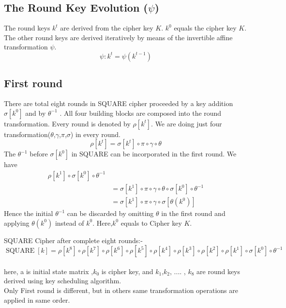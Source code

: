 \documentclass[preprint]{transcrypto}
\begin{document}
\subsection{The Round Key Evolution ($\psi$)}
The round keys $k^{t}$ are derived from the cipher key $K$. $k^{0}$ equals the cipher key $K$. The other round keys are derived iteratively by means of the invertible affine transformation $\psi$.
$$
  \psi: k^{t}=\psi\left(k^{t-1}\right)
$$

\subsection{First round}
There are total eight rounds in SQUARE cipher proceeded by a key addition $\sigma\left[k^{0}\right]$ and by $\theta^{-1}$ .
All four building blocks are composed into the round transformation. Every round is denoted by $\rho\left[k^{t}\right]$. We are doing just four transformation($\theta$,$\gamma$,$\pi$,$\sigma$) in every round.
$$
  \rho\left[k^{t}\right]=\sigma\left[k^{t}\right] \circ \pi \circ \gamma \circ \theta
$$
The $\theta^{-1}$ before $\sigma\left[k^{0}\right]$ in SQUARE can be incorporated in the first round. We have
$$
  \begin{aligned}
    \rho\left[k^{1}\right] \circ \sigma\left[k^{0}\right] \circ \theta^{-1}                               \\ &=\sigma\left[k^{1}\right] \circ \pi \circ \gamma \circ \theta \circ \sigma\left[k^{0}\right] \circ \theta^{-1} \\
     & =\sigma\left[k^{1}\right] \circ \pi \circ \gamma \circ \sigma\left[\theta\left(k^{0}\right)\right]
  \end{aligned}
$$
Hence the initial $\theta^{-1}$ can be discarded by omitting $\theta$ in the first round and applying $\theta\left(k^{0}\right)$ instead of $k^{0} .$
Here,$k^{0}$ equals to Cipher key $K$.

SQUARE Cipher after complete eight rounds:-\\
$$
  \operatorname{SQUARE}[k]=\rho\left[k^{8}\right] \circ \rho\left[k^{7}\right] \circ \rho\left[k^{6}\right] \circ \rho\left[k^{5}\right] \circ \rho\left[k^{4}\right] \circ \rho\left[k^{3}\right] \circ \rho\left[k^{2}\right] \circ \rho\left[k^{1}\right] \circ \sigma\left[k^{0}\right] \circ \theta^{-1}
$$
\\
here, a is initial state matrix ,$k_{0}$ is cipher key, and $k_{1}$,$k_{2}$, .... , $k_{8}$ are round keys derived using key scheduling algorithm.\\
Only First round is different, but in others same transformation operations are applied in same order.
\end{document}
